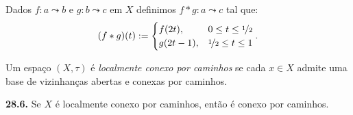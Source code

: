 \begin{definition}
    Dados \(f: a \leadsto b \) e \(g : b \leadsto c\) em \(X\) definimos \(f *g : a \leadsto c\) tal que:
    \[(f*g) (t) := \begin{cases}
        f(2t), &0\leq t \leq \nicefrac{1}{2} \\ 
        g(2t-1), & \nicefrac{1}{2} \leq t \leq 1
    \end{cases}.\] 
\end{definition}

\vspace{-0.4cm}
\begin{definition}
    Um espaço \((X, \tau)\) é \emph{localmente conexo por caminhos} se cada \( x \in X\) admite uma base de vizinhanças abertas e  conexas por caminhos. 
\end{definition}

\begin{proposition}
    \textbf{28.6.} Se \(X\) é localmente conexo por caminhos, então é conexo por caminhos. 
\end{proposition}


